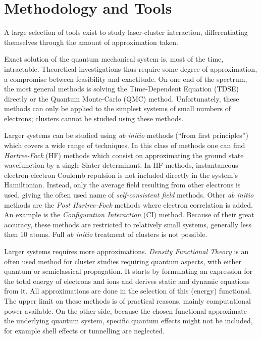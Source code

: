 
\section{Methodology and Tools}
\label{section:tools}

A large selection of tools exist to study laser-cluster interaction,
differentiating themselves through the amount of approximation taken.

Exact solution of the quantum mechanical system is, most of the time,
intractable. Theoretical investigations thus require some degree of
approximation, a compromise between feasibility and exactitude. On one end of
the spectrum, the most general methods is solving the
Time-Dependent \schrodinger Equation (TDSE) directly or the Quantum Monte-Carlo
(QMC) method. Unfortunately, these methods can only be applied to the simplest
systems of small numbers of electrons; clusters cannot be studied using these
methods.

Larger systems can be studied using \textit{ab initio} methods (``from
first principles'') which covers a wide range of techniques. In this class of
methods one can find \textit{Hartree-Fock} (HF) methods which consist on
approximating the ground state wavefunction by a single Slater determinant.
In HF methods, instantaneous electron-electron Coulomb repulsion is not
included directly in the system's Hamiltonian. Instead, only the average field
resulting from other electrons is used, giving the often used name of
\textit{self-consistent field} methods. Other \textit{ab
initio} methods are the \textit{Post Hartree-Fock} methods where electron
correlation is added. An example is the \textit{Configuration Interaction} (CI)
method. Because of their great accuracy, these methods are restricted to
relatively small systems, generally less then 10 atoms. Full \textit{ab initio}
treatment of clusters is not possible.

Larger systems requires more approximations. \textit{Density Functional Theory}
is an often used method for cluster studies requiring quantum aspects, with
either quantum or semiclassical propagation. It starts by formulating an
expression for the total energy of electrons and ions and derives static and
dynamic equations from it. All approximations are done in the selection of this
(energy) functional. The upper limit on these methods is of practical reasons,
mainly computational power available. On the other side, because the chosen
functional approximate the underlying quantum system, specific quantum effects
might not be included, for example shell effects or tunnelling are neglected.


